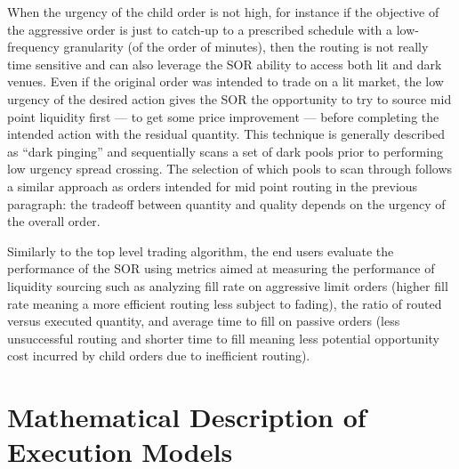 \begin{itemize}
When the urgency of the child order is not high, for instance if the objective of the aggressive order is just to catch-up to a prescribed schedule with a low-frequency granularity (of the order of minutes), then the routing is not really time sensitive and can also leverage the SOR ability to access both lit and dark venues. Even if the original order was intended to trade on a lit market, the low urgency of the desired action gives the SOR the opportunity to try to source mid point liquidity first --- to get some price improvement --- before completing the intended action with the residual quantity. This technique is generally described as ``dark pinging'' and sequentially scans a set of dark pools prior to performing low urgency spread crossing. The selection of which pools to scan through follows a similar approach as orders intended for mid point routing in the previous paragraph: the tradeoff between quantity and quality depends on the urgency of the overall order.
\end{itemize}


Similarly to the top level trading algorithm, the end users evaluate the performance of the SOR using metrics aimed at measuring the performance of liquidity sourcing such as analyzing fill rate on aggressive limit orders (higher fill rate meaning a more efficient routing less subject to fading), the ratio of routed versus executed quantity, and average time to fill on passive orders (less unsuccessful routing and shorter time to fill meaning less potential opportunity cost incurred by child orders due to inefficient routing).



\section{Mathematical Description of Execution Models}


